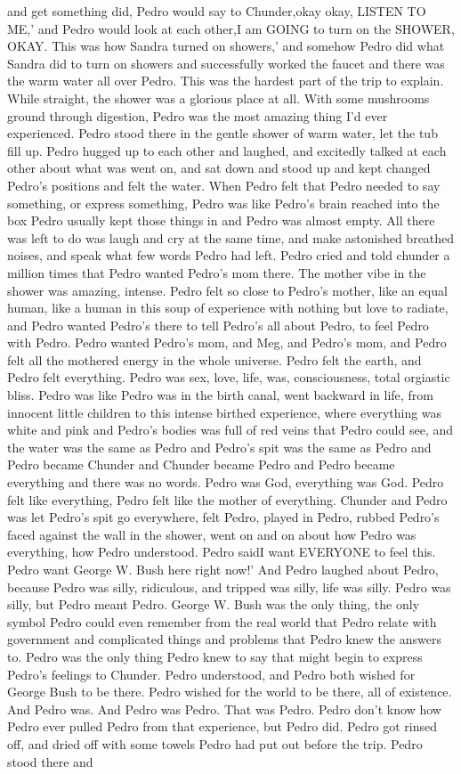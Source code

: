 \documentclass[12pt]{book}
\begin{document}
and get something did, Pedro would say to Chunder,okay okay, LISTEN TO ME,' and Pedro would look at each other,I am GOING to turn on the SHOWER, OKAY. This was how Sandra turned on showers,' and somehow Pedro did what Sandra did to turn on showers and successfully worked the faucet and there was the warm water all over Pedro. This was the hardest part of the trip to explain. While straight, the shower was a glorious place at all. With some mushrooms ground through digestion, Pedro was the most amazing thing I'd ever experienced. Pedro stood there in the gentle shower of warm water, let the tub fill up. Pedro hugged up to each other and laughed, and excitedly talked at each other about what was went on, and sat down and stood up and kept changed Pedro's positions and felt the water. When Pedro felt that Pedro needed to say something, or express something, Pedro was like Pedro's brain reached into the box Pedro usually kept those things in and Pedro was almost empty. All there was left to do was laugh and cry at the same time, and make astonished breathed noises, and speak what few words Pedro had left. Pedro cried and told chunder a million times that Pedro wanted Pedro's mom there. The mother vibe in the shower was amazing, intense. Pedro felt so close to Pedro's mother, like an equal human, like a human in this soup of experience with nothing but love to radiate, and Pedro wanted Pedro's there to tell Pedro's all about Pedro, to feel Pedro with Pedro. Pedro wanted Pedro's mom, and Meg, and Pedro's mom, and Pedro felt all the mothered energy in the whole universe. Pedro felt the earth, and Pedro felt everything. Pedro was sex, love, life, was, consciousness, total orgiastic bliss. Pedro was like Pedro was in the birth canal, went backward in life, from innocent little children to this intense birthed experience, where everything was white and pink and Pedro's bodies was full of red veins that Pedro could see, and the water was the same as Pedro and Pedro's spit was the same as Pedro and Pedro became Chunder and Chunder became Pedro and Pedro became everything and there was no words. Pedro was God, everything was God. Pedro felt like everything, Pedro felt like the mother of everything. Chunder and Pedro was let Pedro's spit go everywhere, felt Pedro, played in Pedro, rubbed Pedro's faced against the wall in the shower, went on and on about how Pedro was everything, how Pedro understood. Pedro saidI want EVERYONE to feel this. Pedro want George W. Bush here right now!' And Pedro laughed about Pedro, because Pedro was silly, ridiculous, and tripped was silly, life was silly. Pedro was silly, but Pedro meant Pedro. George W. Bush was the only thing, the only symbol Pedro could even remember from the real world that Pedro relate with government and complicated things and problems that Pedro knew the answers to. Pedro was the only thing Pedro knew to say that might begin to express Pedro's feelings to Chunder. Pedro understood, and Pedro both wished for George Bush to be there. Pedro wished for the world to be there, all of existence. And Pedro was. And Pedro was Pedro. That was Pedro. Pedro don't know how Pedro ever pulled Pedro from that experience, but Pedro did. Pedro got rinsed off, and dried off with some towels Pedro had put out before the trip. Pedro stood there and 
\end{document}

